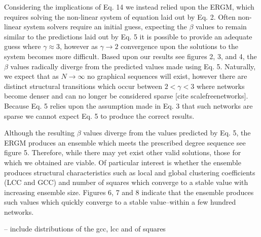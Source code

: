 \documentclass[aip,graphicx,amsmath]{revtex4-1}
\begin{document}
	Considering the implications of Eq. 14 we instead relied upon the ERGM, which requires solving the non-linear system of equation laid out by Eq. 2. Often non-linear system solvers require an initial guess, expecting the $\beta$ values to remain similar to the predictions laid out by Eq. 5 it is possible to provide an adequate guess where $\gamma \approx 3$, however as $\gamma \to 2$ convergence upon the solutions to the system becomes more difficult. Based upon our results see figures 2, 3, and 4, the $\beta$ values radically diverge from the predicted values made using Eq. 5. Naturally, we expect that as $N\to \infty$ no graphical sequences will exist, however there are distinct structural transitions which occur between $2<\gamma<3$ where networks become denser and can no longer be considered sparse [cite scalefreenetworks]. Because Eq. 5 relies upon the assumption made in Eq. 3 that such networks are sparse we cannot expect Eq. 5 to produce the correct results.
	
	Although the resulting $\beta$ values diverge from the values predicted by Eq. 5, the ERGM produces an ensemble which meets the prescribed degree sequence see figure 5. Therefore, while there may yet exist other valid solutions, those for which we obtained are viable. Of particular interest is whether the ensemble produces structural characteristics such as local and global clustering coefficients (LCC and GCC) and number of squares which converge to a stable value with increasing ensemble size. Figures 6, 7 and 8 indicate that the ensemble produces such values which quickly converge to a stable value--within a few hundred networks.

-- include distributions of the gcc, lcc and of squares





%
%
\end{document}
